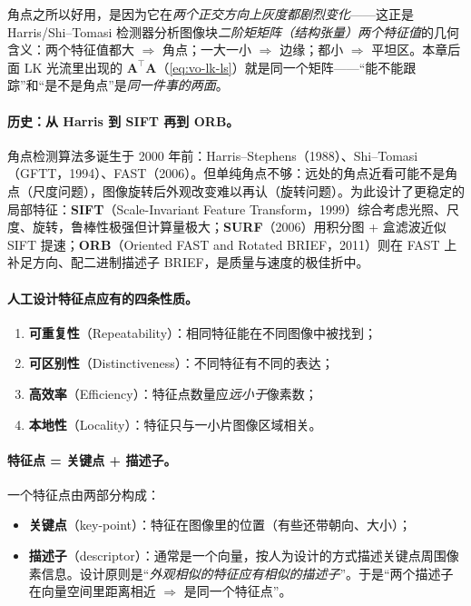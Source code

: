 \begin{insight}
角点之所以好用，是因为它在\emph{两个正交方向上灰度都剧烈变化}——这正是 Harris/Shi--Tomasi 检测器分析图像块\emph{二阶矩矩阵（结构张量）两个特征值}的几何含义\cite{carlone2026handbook}：两个特征值都大 $\Rightarrow$ 角点；一大一小 $\Rightarrow$ 边缘；都小 $\Rightarrow$ 平坦区。本章后面 LK 光流里出现的 $\mathbf{A}^\top\mathbf{A}$（\cref{eq:vo-lk-ls}）就是同一个矩阵——“能不能跟踪”和“是不是角点”是\emph{同一件事的两面}。
\end{insight}

\paragraph{历史：从 Harris 到 SIFT 再到 ORB。}
角点检测算法多诞生于 2000 年前：Harris--Stephens（1988）、Shi--Tomasi（GFTT，1994）、FAST（2006）\cite{carlone2026handbook}。但单纯角点不够：远处的角点近看可能不是角点（尺度问题），图像旋转后外观改变难以再认（旋转问题）。为此设计了更稳定的局部特征：\textbf{SIFT}（Scale-Invariant Feature Transform，1999）综合考虑光照、尺度、旋转，鲁棒性极强但计算量极大；\textbf{SURF}（2006）用积分图 + 盒滤波近似 SIFT 提速；\textbf{ORB}（Oriented FAST and Rotated BRIEF，2011）则在 FAST 上补足方向、配二进制描述子 BRIEF，是质量与速度的极佳折中。

\paragraph{人工设计特征点应有的四条性质\cite{gaoxiang2019slam14}。}
\begin{enumerate}
  \item \textbf{可重复性}（Repeatability）：相同特征能在不同图像中被找到；
  \item \textbf{可区别性}（Distinctiveness）：不同特征有不同的表达；
  \item \textbf{高效率}（Efficiency）：特征点数量应\emph{远小于}像素数；
  \item \textbf{本地性}（Locality）：特征只与一小片图像区域相关。
\end{enumerate}

\paragraph{特征点 = 关键点 + 描述子。}
一个特征点由两部分构成\cite{gaoxiang2019slam14,carlone2026handbook}：
\begin{itemize}
  \item \textbf{关键点}（key-point）：特征在图像里的位置（有些还带朝向、大小）；
  \item \textbf{描述子}（descriptor）：通常是一个向量，按人为设计的方式描述关键点周围像素信息。设计原则是“\emph{外观相似的特征应有相似的描述子}”。于是“两个描述子在向量空间里距离相近 $\Rightarrow$ 是同一个特征点”。
\end{itemize}

